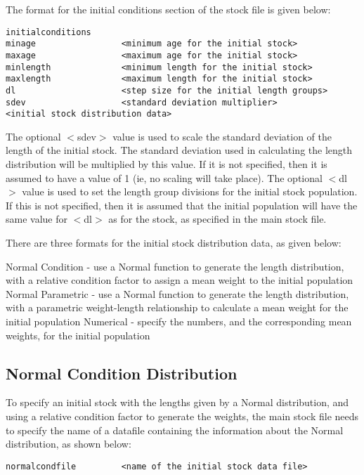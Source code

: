 \documentclass[10pt,twoside]{book}
\begin{document}
\bigskip
The format for the initial conditions section of the stock file is given below:

{\small\begin{verbatim}
initialconditions
minage                 <minimum age for the initial stock>
maxage                 <maximum age for the initial stock>
minlength              <minimum length for the initial stock>
maxlength              <maximum length for the initial stock>
dl                     <step size for the initial length groups>
sdev                   <standard deviation multiplier>
<initial stock distribution data>
\end{verbatim}}

The optional $<$sdev$>$ value is used to scale the standard deviation of the length of the initial stock.  The standard deviation used in calculating the length distribution will be multiplied by this value.  If it is not specified, then it is assumed to have a value of 1 (ie, no scaling will take place).  The optional $<$dl$>$ value is used to set the length group divisions for the initial stock population.  If this is not specified, then it is assumed that the initial population will have the same value for $<$dl$>$ as for the stock, as specified in the main stock file.

\bigskip
There are three formats for the initial stock distribution data, as given below:

\bigskip
Normal Condition - use a Normal function to generate the length distribution, with a relative condition factor to assign a mean weight to the initial population\newline
Normal Parametric - use a Normal function to generate the length distribution, with a parametric weight-length relationship to calculate a mean weight for the initial population\newline
Numerical - specify the numbers, and the corresponding mean weights, for the initial population

\subsection{Normal Condition Distribution}
To specify an initial stock with the lengths given by a Normal distribution, and using a relative condition factor to generate the weights, the main stock file needs to specify the name of a datafile containing the information about the Normal distribution, as shown below:

{\small\begin{verbatim}
normalcondfile         <name of the initial stock data file>
\end{verbatim}}
\end{document}

